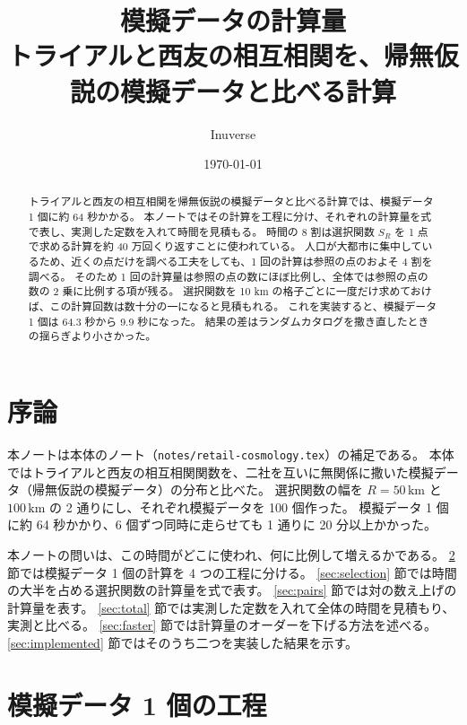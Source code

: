 \documentclass[a4paper,11pt]{ltjsarticle}
\title{模擬データの計算量\\
  \large トライアルと西友の相互相関を、帰無仮説の模擬データと比べる計算}
\author{Inuverse}
\date{\today}
\newcommand{\code}[1]{\texttt{#1}}
\begin{document}
\maketitle

\begin{abstract}
トライアルと西友の相互相関を帰無仮説の模擬データと比べる計算では、模擬データ 1 個に約 64 秒かかる。
本ノートではその計算を工程に分け、それぞれの計算量を式で表し、実測した定数を入れて時間を見積もる。
時間の 8 割は選択関数 $S_R$ を 1 点で求める計算を約 40 万回くり返すことに使われている。
人口が大都市に集中しているため、近くの点だけを調べる工夫をしても、1 回の計算は参照の点のおよそ 4 割を調べる。
そのため 1 回の計算量は参照の点の数にほぼ比例し、全体では参照の点の数の 2 乗に比例する項が残る。
選択関数を 10 km の格子ごとに一度だけ求めておけば、この計算回数は数十分の一になると見積もれる。
これを実装すると、模擬データ 1 個は 64.3 秒から 9.9 秒になった。
結果の差はランダムカタログを撒き直したときの揺らぎより小さかった。
\end{abstract}

\tableofcontents

\section{序論}
\label{sec:intro}

本ノートは本体のノート（\code{notes/retail-cosmology.tex}）の補足である。
本体ではトライアルと西友の相互相関関数を、二社を互いに無関係に撒いた模擬データ（帰無仮説の模擬データ）の分布と比べた。
選択関数の幅を $R = 50\,\mathrm{km}$ と $100\,\mathrm{km}$ の 2 通りにし、それぞれ模擬データを 100 個作った。
模擬データ 1 個に約 64 秒かかり、6 個ずつ同時に走らせても 1 通りに 20 分以上かかった。

本ノートの問いは、この時間がどこに使われ、何に比例して増えるかである。
\ref{sec:steps} 節では模擬データ 1 個の計算を 4 つの工程に分ける。
\ref{sec:selection} 節では時間の大半を占める選択関数の計算量を式で表す。
\ref{sec:pairs} 節では対の数え上げの計算量を表す。
\ref{sec:total} 節では実測した定数を入れて全体の時間を見積もり、実測と比べる。
\ref{sec:faster} 節では計算量のオーダーを下げる方法を述べる。
\ref{sec:implemented} 節ではそのうち二つを実装した結果を示す。

\section{模擬データ 1 個の工程}
\label{sec:steps}
\end{document}
